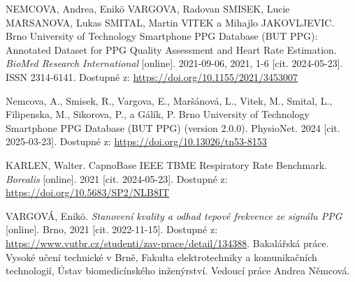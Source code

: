 

\begin{thebibliography}{99}

		NEMCOVA, Andrea, Enikö VARGOVA, Radovan SMISEK, Lucie MARSANOVA, Lukas SMITAL, Martin VITEK a Mihajlo JAKOVLJEVIC.
		Brno University of Technology Smartphone PPG Database (BUT PPG): Annotated Dataset for PPG Quality Assessment and Heart Rate Estimation.
		\emph{BioMed Research International} [online].
		2021-09-06, 2021, 1-6 [cit. 2024-05-23].
		ISSN 2314-6141.
		Dostupné z: \url{https://doi.org/10.1155/2021/3453007}

		Nemcova, A., Smisek, R., Vargova, E., Maršánová, L., Vitek, M., Smital, L., Filipenska, M., Sikorova, P., a Gálík, P.
		Brno University of Technology Smartphone PPG Database (BUT PPG) (version 2.0.0).
		PhysioNet.
		2024 [cit. 2025-03-23].
		Dostupné z: \url{https://doi.org/10.13026/tn53-8153}

		KARLEN, Walter.
		CapnoBase IEEE TBME Respiratory Rate Benchmark.
		\emph{Borealis} [online].
		2021 [cit. 2024-05-23].
		Dostupné z: \url{https://doi.org/10.5683/SP2/NLB8IT}


		VARGOVÁ, Enikö.
		\emph{Stanovení kvality a odhad tepové frekvence ze signálu PPG} [online].
		Brno, 2021 [cit. 2022-11-15].
		Dostupné z: \url{https://www.vutbr.cz/studenti/zav-prace/detail/134388}.
		Bakalářská práce. Vysoké učení technické v Brně, Fakulta elektrotechniky a komunikačních technologií, Ústav biomedicínského inženýrství.
		Vedoucí práce Andrea Němcová.


\end{thebibliography}
